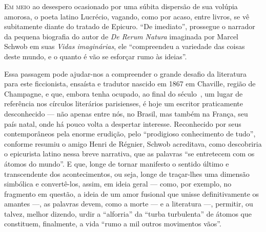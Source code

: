 

\noindent\textsc{Em meio} ao desespero ocasionado por uma súbita dispersão de sua volúpia amorosa,
o poeta latino Lucrécio, vagando, como por acaso, entre livros, se vê
subitamente diante do tratado de Epicuro. “De imediato”, prossegue o narrador
da pequena biografia do autor de \textit{De Rerum Natura} imaginada por Marcel
Schwob em suas \textit{Vidas imaginárias}, ele “compreendeu a variedade das
coisas deste mundo, e o quanto é vão se esforçar rumo às ideias”. 

Essa passagem pode ajudar-nos a compreender o grande desafio da literatura para
este ficcionista, ensaísta e tradutor nascido em 1867 em Chaville, região de
Champagne, e que, embora tenha ocupado, ao final do século~, um lugar de
referência nos círculos literários parisienses, é hoje um escritor praticamente
desconhecido --- não apenas entre nós, no Brasil, mas também na França, seu país
natal, onde há pouco volta a despertar interesse. Reconhecido por seus
contemporâneos pela enorme erudição, pelo “prodigioso conhecimento de tudo”,
conforme resumiu o amigo Henri de Régnier, Schwob
acreditava, como descobriria o epicurista latino nessa breve narrativa, que as
palavras “se entretecem com os átomos do mundo”. E que, longe de
tornar manifesto o sentido último e transcendente dos acontecimentos, ou seja,
longe de traçar-lhes uma dimensão simbólica e convertê-los, assim, em ideia
geral --- como, por exemplo, no fragmento em questão, a ideia de um amor fusional
que unisse definitivamente os amantes ---, as palavras devem, como a morte --- e a
literatura ---, permitir, ou talvez, melhor dizendo, urdir a “alforria” da “turba
turbulenta” de átomos que constituem, finalmente, a vida “rumo a mil outros
movimentos vãos”. 

